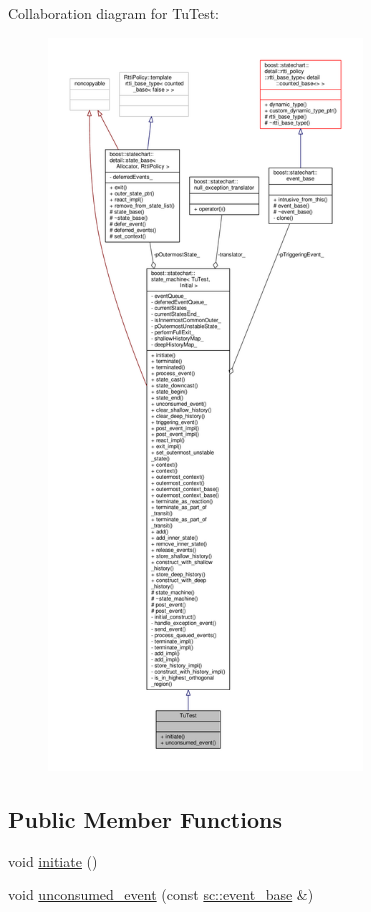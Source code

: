 Collaboration diagram for Tu\+Test\+:
\nopagebreak
\begin{figure}[H]
\begin{center}
\leavevmode
\includegraphics[height=550pt]{struct_tu_test__coll__graph}
\end{center}
\end{figure}
\subsection*{Public Member Functions}
\begin{DoxyCompactItemize}
\item 
void \mbox{\hyperlink{struct_tu_test_a9f447a6fee2142e3b1a064c9f6d64c17}{initiate}} ()
\item 
void \mbox{\hyperlink{struct_tu_test_a9d6f2c7c34d5698076897b2ebcb1d1f4}{unconsumed\+\_\+event}} (const \mbox{\hyperlink{classboost_1_1statechart_1_1event__base}{sc\+::event\+\_\+base}} \&)
\end{DoxyCompactItemize}
